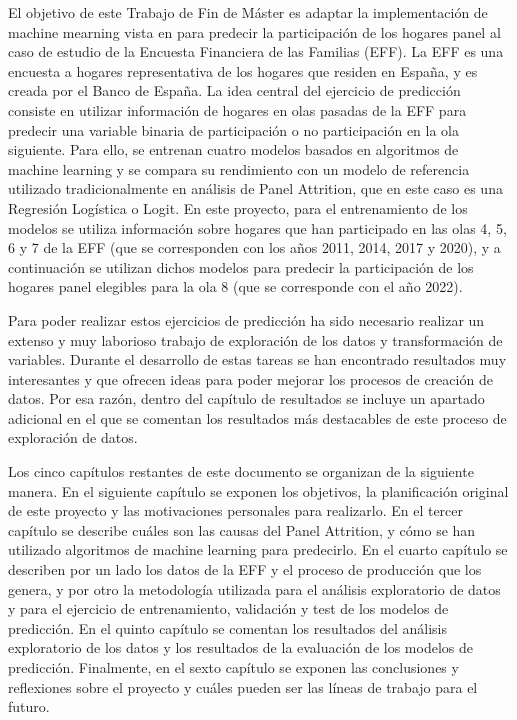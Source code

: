 El objetivo de este Trabajo de Fin de Máster es adaptar la implementación de machine mearning vista en \cite{beste2023case} para predecir la participación de los hogares panel al caso de estudio de la Encuesta Financiera de las Familias (EFF). La EFF es una encuesta a hogares representativa de los hogares que residen en España, y es creada por el Banco de España. La idea central del ejercicio de predicción consiste en utilizar información de hogares en olas pasadas de la EFF para predecir una variable binaria de participación o no participación en la ola siguiente. Para ello, se entrenan cuatro modelos basados en algoritmos de machine learning y se compara su rendimiento con un modelo de referencia utilizado tradicionalmente en análisis de Panel Attrition, que en este caso es una Regresión Logística o Logit. En este proyecto, para el entrenamiento de los modelos se utiliza información sobre hogares que han participado en las olas 4, 5, 6 y 7 de la EFF (que se corresponden con los años 2011, 2014, 2017 y 2020), y a continuación se utilizan dichos modelos para predecir la participación de los hogares panel elegibles para la ola 8 (que se corresponde con el año 2022).

Para poder realizar estos ejercicios de predicción ha sido necesario realizar un extenso y muy laborioso trabajo de exploración de los datos y transformación de variables. Durante el desarrollo de estas tareas se han encontrado resultados muy interesantes y que ofrecen ideas para poder mejorar los procesos de creación de datos. Por esa razón, dentro del capítulo de resultados se incluye un apartado adicional en el que se comentan los resultados más destacables de este proceso de exploración de datos.

Los cinco capítulos restantes de este documento se organizan de la siguiente manera. En el siguiente capítulo se exponen los objetivos, la planificación original de este proyecto y las motivaciones personales para realizarlo. En el tercer capítulo se describe cuáles son las causas del Panel Attrition, y cómo se han utilizado algoritmos de machine learning para predecirlo. En el cuarto capítulo se describen por un lado los datos de la EFF y el proceso de producción que los genera, y por otro la metodología utilizada para el análisis exploratorio de datos y para el ejercicio de entrenamiento, validación y test de los modelos de predicción. En el quinto capítulo se comentan los resultados del análisis exploratorio de los datos y los resultados de la evaluación de los modelos de predicción. Finalmente, en el sexto capítulo se exponen las conclusiones y reflexiones sobre el proyecto y cuáles pueden ser las líneas de trabajo para el futuro.